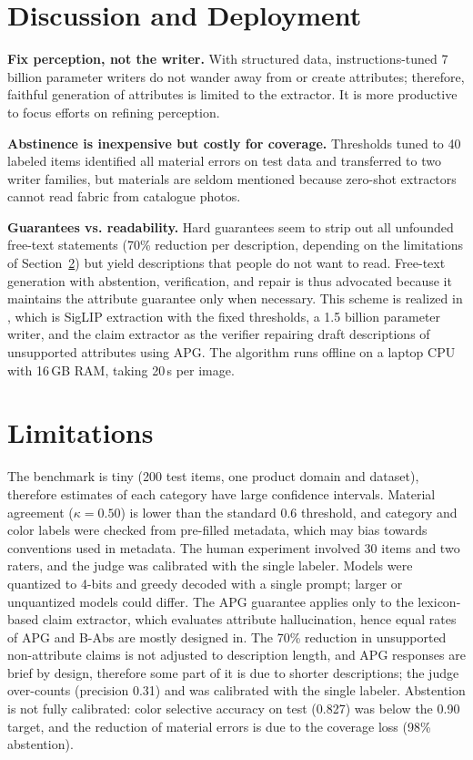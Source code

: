 \documentclass[runningheads]{llncs}
\newcommand{\cond}[1]{\textsf{#1}}
\begin{document}
\section{Discussion and Deployment}\label{sec:discussion}
\textbf{Fix perception, not the writer.} With structured data, instructions-tuned 7 billion parameter writers do not wander away from or create attributes; therefore, faithful generation of attributes is limited to the extractor. It is more productive to focus efforts on refining perception.

\textbf{Abstinence is inexpensive but costly for coverage.} Thresholds tuned to 40 labeled items identified all material errors on test data and transferred to two writer families, but materials are seldom mentioned because zero-shot extractors cannot read fabric from catalogue photos.

\textbf{Guarantees vs. readability.} Hard guarantees seem to strip out all unfounded free-text statements (70\% reduction per description, depending on the limitations of Section~\ref{sec:limits}) but yield descriptions that people do not want to read. Free-text generation with abstention, verification, and repair is thus advocated because it maintains the attribute guarantee only when necessary. This scheme is realized in \appname, which is SigLIP extraction with the fixed thresholds, a 1.5 billion parameter writer, and the claim extractor as the verifier repairing draft descriptions of unsupported attributes using APG. The algorithm runs offline on a laptop CPU with 16\,GB RAM, taking 20\,s per image.

\section{Limitations}\label{sec:limits}
The benchmark is tiny (200 test items, one product domain and dataset), therefore estimates of each category have large confidence intervals. Material agreement ($\kappa=0.50$) is lower than the standard 0.6 threshold, and category and color labels were checked from pre-filled metadata, which may bias towards conventions used in metadata. The human experiment involved 30 items and two raters, and the judge was calibrated with the single labeler. Models were quantized to 4-bits and greedy decoded with a single prompt; larger or unquantized models could differ. The APG guarantee applies only to the lexicon-based claim extractor, which evaluates attribute hallucination, hence equal rates of APG and \cond{B-Abs} are mostly designed in. The 70\% reduction in unsupported non-attribute claims is not adjusted to description length, and APG responses are brief by design, therefore some part of it is due to shorter descriptions; the judge over-counts (precision 0.31) and was calibrated with the single labeler. Abstention is not fully calibrated: color selective accuracy on test (0.827) was below the 0.90 target, and the reduction of material errors is due to the coverage loss (98\% abstention).
\end{document}
